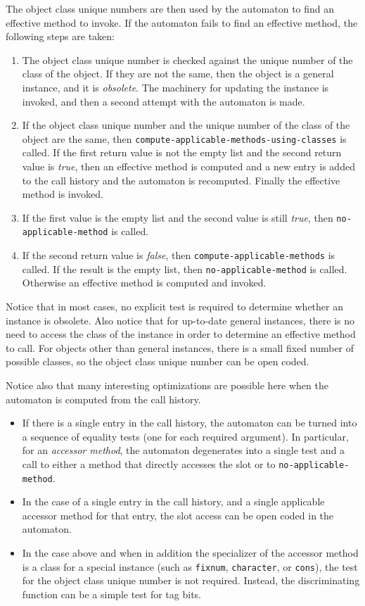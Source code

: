 The object class unique numbers are then used by the automaton to find
an effective method to invoke.  If the automaton fails to find an
effective method, the following steps are taken:

\begin{enumerate}
\item The object class unique number is checked against the unique
  number of the class of the object.  If they are not the same, then
  the object is a general instance, and it is \emph{obsolete}.  The
  machinery for updating the instance is invoked, and then a second
  attempt with the automaton is made. 
\item If the object class unique number and the unique number of the
  class of the object are the same, then
  \texttt{compute-applicable-methods-using-classes} is called.  If the
  first return value is not the empty list and the second return value
  is \textit{true}, then an effective method is computed and a new
  entry is added to the call history and the automaton is recomputed.
  Finally the effective method is invoked.
\item If the first value is the empty list and the second value is
  still \textit{true}, then \texttt{no-applicable-method} is called.
\item If the second return value is \textit{false}, then 
 \texttt{compute-applicable-methods} is called.  If the result is the
 empty list, then \texttt{no-applicable-method} is called.  Otherwise
 an effective method is computed and invoked. 
\end{enumerate}

Notice that in most cases, no explicit test is required to determine
whether an instance is obsolete.  Also notice that for up-to-date
general instances, there is no need to access the class of the
instance in order to determine an effective method to call.  For
objects other than general instances, there is a small fixed number of
possible classes, so the object class unique number can be open coded.

Notice also that many interesting optimizations are possible here when
the automaton is computed from the call history.

\begin{itemize}
\item If there is a single entry in the call history, the automaton
  can be turned into a sequence of equality tests (one for each
  required argument).  In particular, for an \emph{accessor method},
  the automaton degenerates into a single test and a call to either
  a method that directly accesses the slot or to
  \texttt{no-applicable-method}. 
\item In the case of a single entry in the call history, and a single
  applicable accessor method for that entry, the slot access can be
  open coded in the automaton. 
\item In the case above and when in addition the specializer of the
  accessor method is a class for a special instance (such as
  \texttt{fixnum}, \texttt{character}, or \texttt{cons}), the test for
  the object class unique number is not required.  Instead, the
  discriminating function can be a simple test for tag bits.
\end{itemize}

